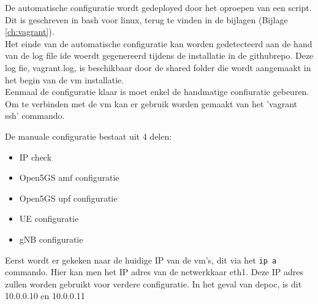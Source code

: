 De automatische configuratie wordt gedeployed door het oproepen van een script. Dit is geschreven in bash voor linux, terug te vinden in de bijlagen (Bijlage \ref{ch:vagrant}).\\

Het einde van de automatische configuratie kan worden gedetecteerd aan de hand van de log file ide woerdt gegenereerd tijdens de installatie in de githubrepo. Deze log fie, vagrant.log, is beschikbaar door de shared folder die wordt aangemaakt in het begin van de \gls{vm} installatie. \\

Eenmaal de configuratie klaar is moet enkel de handmatige confiuratie gebeuren.
Om te verbinden met de \gls{vm} kan er gebruik worden gemaakt van het 'vagrant ssh' commando.

De manuale configuratie bestaat uit 4 delen:

\begin{itemize}
    \item IP check
    \item Open5GS \gls{amf} configuratie
    \item Open5GS \gls{upf} configuratie
    \item UE configuratie
    \item gNB configuratie
\end{itemize}

Eerst wordt er gekeken naar de huidige IP van de \gls{vm}'s, dit via het \lstinline!ip a! commando. Hier kan men het IP adres van de netwerkkaar eth1. Deze IP adres zullen worden gebruikt voor verdere configuratie. In het geval van de\gls{poc}, is dit 10.0.0.10 en 10.0.0.11

